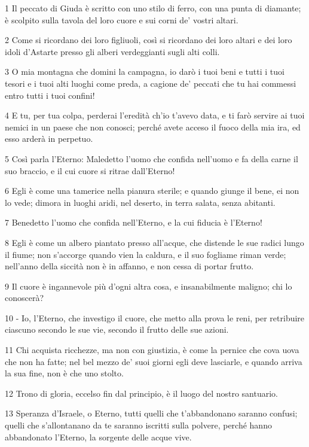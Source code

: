 \par 1 Il peccato di Giuda è scritto con uno stilo di ferro, con una punta di diamante; è scolpito sulla tavola del loro cuore e sui corni de' vostri altari.
\par 2 Come si ricordano dei loro figliuoli, così si ricordano dei loro altari e dei loro idoli d'Astarte presso gli alberi verdeggianti sugli alti colli.
\par 3 O mia montagna che domini la campagna, io darò i tuoi beni e tutti i tuoi tesori e i tuoi alti luoghi come preda, a cagione de' peccati che tu hai commessi entro tutti i tuoi confini!
\par 4 E tu, per tua colpa, perderai l'eredità ch'io t'avevo data, e ti farò servire ai tuoi nemici in un paese che non conosci; perché avete acceso il fuoco della mia ira, ed esso arderà in perpetuo.
\par 5 Così parla l'Eterno: Maledetto l'uomo che confida nell'uomo e fa della carne il suo braccio, e il cui cuore si ritrae dall'Eterno!
\par 6 Egli è come una tamerice nella pianura sterile; e quando giunge il bene, ei non lo vede; dimora in luoghi aridi, nel deserto, in terra salata, senza abitanti.
\par 7 Benedetto l'uomo che confida nell'Eterno, e la cui fiducia è l'Eterno!
\par 8 Egli è come un albero piantato presso all'acque, che distende le sue radici lungo il fiume; non s'accorge quando vien la caldura, e il suo fogliame riman verde; nell'anno della siccità non è in affanno, e non cessa di portar frutto.
\par 9 Il cuore è ingannevole più d'ogni altra cosa, e insanabilmente maligno; chi lo conoscerà?
\par 10 - Io, l'Eterno, che investigo il cuore, che metto alla prova le reni, per retribuire ciascuno secondo le sue vie, secondo il frutto delle sue azioni.
\par 11 Chi acquista ricchezze, ma non con giustizia, è come la pernice che cova uova che non ha fatte; nel bel mezzo de' suoi giorni egli deve lasciarle, e quando arriva la sua fine, non è che uno stolto.
\par 12 Trono di gloria, eccelso fin dal principio, è il luogo del nostro santuario.
\par 13 Speranza d'Israele, o Eterno, tutti quelli che t'abbandonano saranno confusi; quelli che s'allontanano da te saranno iscritti sulla polvere, perché hanno abbandonato l'Eterno, la sorgente delle acque vive.

